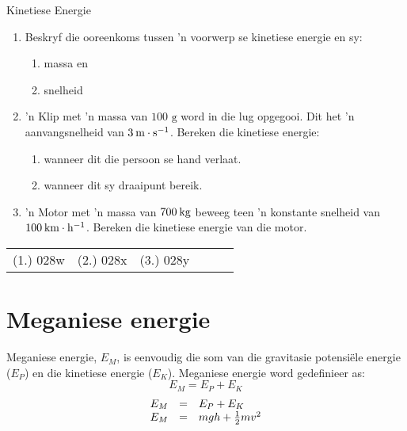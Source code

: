 \begin{exercises}{Kinetiese Energie }
            \nopagebreak
        \label{m38785*id68123}\begin{enumerate}[noitemsep, label=\textbf{\arabic*}. ] 
            \label{m38785*uid69}\item Beskryf die ooreenkoms tussen  'n voorwerp se kinetiese energie en sy:
\label{m38785*id68139}\begin{enumerate}[noitemsep, label=\textbf{\alph*}. ] 
            \label{m38785*uid70}\item  massa en
\label{m38785*uid71}\item snelheid
\end{enumerate}
                \label{m38785*uid72}\item  'n Klip met  'n massa van $100 \text{ g}$ word in die lug opgegooi. Dit het  'n aanvangsnelheid van $3\phantom{\rule{2pt}{0ex}}\text{m}\ensuremath{\cdot}\text{s}{}^{-1}$. Bereken die kinetiese energie:
\label{m38785*id68206}\begin{enumerate}[noitemsep, label=\textbf{\alph*}. ] 
            \label{m38785*uid73}\item wanneer dit die persoon se hand verlaat.
\label{m38785*uid74}\item  wanneer dit sy draaipunt bereik.
\end{enumerate}
                \label{m38785*uid75}\item  'n Motor met  'n massa van $700\phantom{\rule{2pt}{0ex}}\text{kg}$ beweeg teen  'n konstante snelheid van $100\phantom{\rule{2pt}{0ex}}\text{km}\ensuremath{\cdot}\text{h}{}^{-1}$. Bereken die kinetiese energie van die motor.
\end{enumerate}
  \label{m38785**end}
\practiceinfo
 \par \begin{tabular}[h]{cccccc}
 (1.) 028w  &  (2.) 028x  &  (3.) 028y  & \end{tabular}
\end{exercises}
         \section{Meganiese energie}
    \nopagebreak
      \label{m38786*id68299}Meganiese energie, ${E}_{M}$, is eenvoudig die som van die gravitasie potensi\"{e}le energie (${E}_{P}$) en die kinetiese energie (${E}_{K}$). Meganiese energie word gedefinieer as:
      \label{m38786*uid76}\nopagebreak\noindent{}
    \begin{equation}
    {E}_{M}={E}_{P}+{E}_{K}
      \end{equation}
      \label{m38786*uid77}\nopagebreak\noindent{}
    \begin{equation}
    \begin{array}{ccc}\hfill {E}_{M}& =& {E}_{P}+{E}_{K}\hfill \\ \hfill {E}_{M}& =& mgh+\frac{1}{2}m{v}^{2}\hfill \end{array}
      \end{equation}

